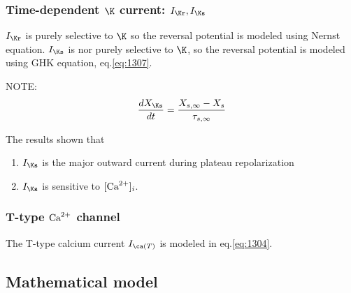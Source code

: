 \subsubsection{Time-dependent $\K$ current: $I_\Kr, I_\Ks$}
\label{sec:i_k-rightarrow-i_kr}

$I_\Kr$ is purely selective to $\K$ so the reversal potential is modeled using
Nernst equation. $I_\Ks$ is nor purely selective to $\K$, so the reversal
potential is modeled using GHK equation, eq.\ref{eq:1307}.

\begin{framed}
  NOTE:
  \begin{equation}
    \label{eq:1310}
    \frac{dX_\Ks}{dt} = \frac{X_{s,\infty}-X_s}{\tau_{s,\infty}}
  \end{equation}
\end{framed}

The results shown that
\begin{enumerate}
\item $I_\Ks$ is the major outward current during plateau
  repolarization 
\item $I_\Ks$ is sensitive to $[{\text{Ca}^{2+}}]_i$.
\end{enumerate}

\subsubsection{T-type ${\text{Ca}^{2+}}$ channel}

The T-type calcium current $I_{\ca(T)}$ is modeled in eq.\ref{eq:1304}.

\subsection{Mathematical model}

